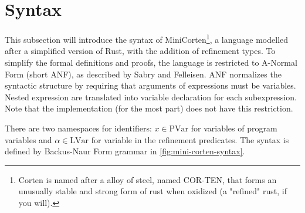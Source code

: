 \documentclass[twoside, english, final]{sdqthesis}
\theoremstyle{definition}
\begin{document}
\section{Syntax}

This subsection will introduce the syntax of MiniCorten\footnote{Corten is named after a alloy of steel, named COR-TEN, that forms an unusually stable and strong form of rust when oxidized (a "refined" rust, if you will).}, a language modelled after a simplified version of Rust, with the addition of refinement types.
To simplify the formal definitions and proofs, the language is restricted to A-Normal Form (short ANF), as described by Sabry and Felleisen\cite{sabry_reasoning_1993}.
ANF normalizes the syntactic structure by requiring that arguments of expressions must be variables. Nested expression are translated into variable declaration for each subexpression. Note that the implementation (for the most part) does not have this restriction.

There are two namespaces for identifiers: $x \in \text{PVar}$ for variables of program variables and $\alpha \in \text{LVar}$ for variable in the refinement predicates. The syntax is defined by Backus-Naur Form grammar in \cref{fig:mini-corten-syntax}.
\end{document}
